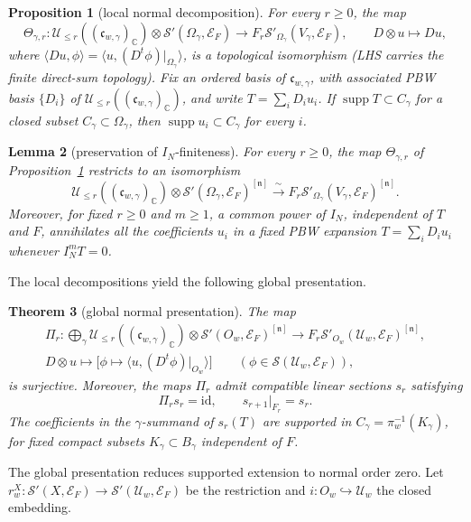\documentclass[a4paper,12pt]{amsart}
\numberwithin{equation}{section}
\newtheorem{theorem}{Theorem}[section]
\newtheorem{proposition}[theorem]{Proposition}
\newtheorem{lemma}[theorem]{Lemma}
\theoremstyle{definition}
\theoremstyle{remark}
\newcommand{\C}{\mathbb C}
\newcommand{\fn}{\mathfrak n}
\newcommand{\fc}{\mathfrak c}
\newcommand{\IN}{I_N}
\newcommand{\mcU}{\mathcal U}
\newcommand{\mcS}{\mathcal S}
\newcommand{\mcE}{\mathcal E}
\newcommand{\supp}{\operatorname{supp}}
\newcommand{\id}{\mathrm{id}}
\begin{document}
\begin{proposition}[local normal decomposition]\label{prop:local-presentation}
For every $r\ge0$, the map
\[
 \Theta_{\gamma,r}:\mcU_{\le r}((\fc_{w,\gamma})_\C)\otimes\mcS'(\Omega_\gamma,\mcE_F)\longrightarrow F_r\mcS'_{\Omega_\gamma}(V_\gamma,\mcE_F),\qquad D\otimes u\mapsto Du,
\]
where $\langle Du,\phi\rangle=\langle u,(D^t\phi)|_{\Omega_\gamma}\rangle$, is a topological isomorphism (LHS carries the finite direct-sum topology). Fix an ordered basis of $\fc_{w,\gamma}$, with associated PBW basis $\{D_i\}$ of $\mcU_{\le r}((\fc_{w,\gamma})_\C)$, and write $T=\sum_iD_iu_i$. If $\supp T\subset C_\gamma$ for a closed subset $C_\gamma\subset\Omega_\gamma$, then $\supp u_i\subset C_\gamma$ for every $i$.
\end{proposition}

\begin{lemma}[preservation of $\IN$-finiteness]\label{lem:IN-bounds}
For every $r\ge0$, the map $\Theta_{\gamma,r}$ of Proposition~\ref{prop:local-presentation} restricts to an isomorphism
\[
 \mcU_{\le r}((\fc_{w,\gamma})_\C)\otimes\mcS'(\Omega_\gamma,\mcE_F)^{[\fn]}\xrightarrow{\ \sim\ }F_r\mcS'_{\Omega_\gamma}(V_\gamma,\mcE_F)^{[\fn]}.
\]
Moreover, for fixed $r\ge0$ and $m\ge1$, a common power of $\IN$, independent of $T$ and $F$, annihilates all the coefficients $u_i$ in a fixed PBW expansion $T=\sum_iD_iu_i$ whenever $\IN^mT=0$.
\end{lemma}

The local decompositions yield the following global presentation.

\begin{theorem}[global normal presentation]\label{thm:global-presentation}
The map
\[
\begin{gathered}
 \Pi_r:\bigoplus_\gamma\mcU_{\le r}((\fc_{w,\gamma})_\C)\otimes\mcS'(O_w,\mcE_F)^{[\fn]}\longrightarrow F_r\mcS'_{O_w}(\mcU_w,\mcE_F)^{[\fn]},\\
 D\otimes u\longmapsto\bigl[\phi\mapsto\langle u,(D^t\phi)|_{O_w}\rangle\bigr]\qquad(\phi\in\mcS(\mcU_w,\mcE_F)),
\end{gathered}
\]
is surjective. Moreover, the maps $\Pi_r$ admit compatible linear sections $s_r$ satisfying
\[
 \Pi_rs_r=\id,\qquad s_{r+1}|_{F_r}=s_r.
\]
The coefficients in the $\gamma$-summand of $s_r(T)$ are supported in $C_\gamma=\pi_w^{-1}(K_\gamma)$, for fixed compact subsets $K_\gamma\subset B_\gamma$ independent of $F$.
\end{theorem}

The global presentation reduces supported extension to normal order zero. Let $r^X_w:\mcS'(X,\mcE_F)\to\mcS'(\mcU_w,\mcE_F)$ be the restriction and $i:O_w\hookrightarrow\mcU_w$ the closed embedding.
\end{document}
